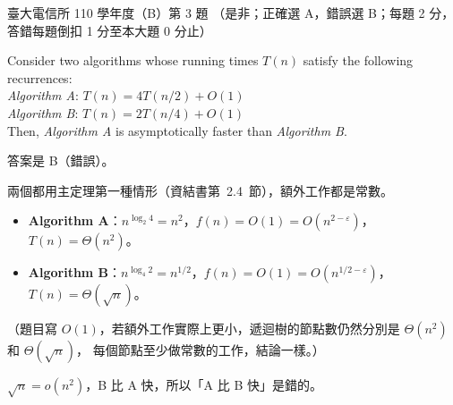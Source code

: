 \begin{pastexam}[label={px:ntu-110-comm-dsa-03}]{臺大電信所 110 學年度（B）第 3 題}
（是非；正確選 A，錯誤選 B；每題 2 分，答錯每題倒扣 1 分至本大題 0 分止）

Consider two algorithms whose running times $T(n)$ satisfy the following recurrences:\\
\textit{Algorithm A}: $T(n)=4T(n/2)+O(1)$\\
\textit{Algorithm B}: $T(n)=2T(n/4)+O(1)$\\
Then, \textit{Algorithm A} is asymptotically faster than \textit{Algorithm B}.
\end{pastexam}

\begin{pastsoln}
答案是 B（錯誤）。

兩個都用主定理第一種情形（資結書第~2.4~節），額外工作都是常數。
\begin{itemize}
\item \textbf{Algorithm A}：$n^{\log_2 4} = n^2$，$f(n) = O(1) = O(n^{2 - \varepsilon})$，$T(n) = \Theta(n^2)$。
\item \textbf{Algorithm B}：$n^{\log_4 2} = n^{1/2}$，$f(n) = O(1) = O(n^{1/2 - \varepsilon})$，
$T(n) = \Theta(\sqrt{n})$。
\end{itemize}
（題目寫 $O(1)$，若額外工作實際上更小，遞迴樹的節點數仍然分別是 $\Theta(n^2)$ 和 $\Theta(\sqrt n)$，
每個節點至少做常數的工作，結論一樣。）

$\sqrt n = o(n^2)$，B 比 A 快，所以「A 比 B 快」是錯的。
\end{pastsoln}
